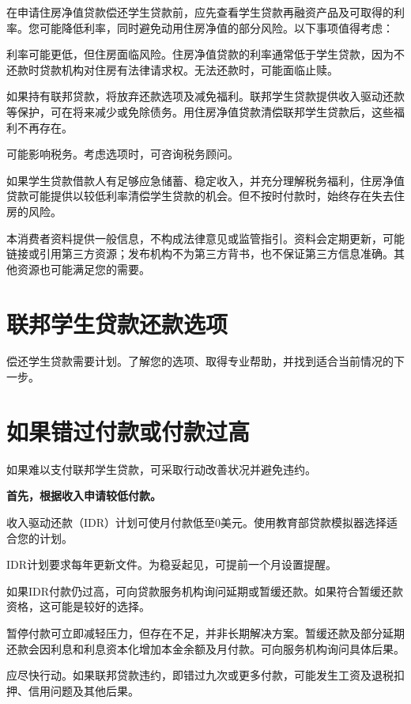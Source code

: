 \documentclass[UTF8,fontset=none,11pt,a4paper]{ctexart}
\begin{document}
在申请住房净值贷款偿还学生贷款前，应先查看学生贷款再融资产品及可取得的利率。您可能降低利率，同时避免动用住房净值的部分风险。以下事项\allowbreak\mbox{值得考虑：}


利率可能更低，但住房面临风险。住房净值贷款的利率通常低于学生贷款，因为不还款时贷款机构对住房有法律请求权。无法还款时，可能\allowbreak\mbox{面临止赎。}


如果持有联邦贷款，将放弃还款选项及减免福利。联邦学生贷款提供收入驱动还款等保护，可在将来减少或免除债务。用住房净值贷款清偿联邦学生贷款后，这些福利\allowbreak\mbox{不再存在。}


可能影响税务。考虑选项时，可咨询\allowbreak\mbox{税务顾问。}


如果学生贷款借款人有足够应急储蓄、稳定收入，并充分理解税务福利，住房净值贷款可能提供以较低利率清偿学生贷款的机会。但不按时付款时，始终存在失去住\allowbreak\mbox{房的风险。}


本消费者资料提供一般信息，不构成法律意见或监管指引。资料会定期更新，可能链接或引用第三方资源；发布机构不为第三方背书，也不保证第三方信息准确。其他资源也可能满足\allowbreak\mbox{您的需要。}


\section*{联邦学生贷款还款选项}
偿还学生贷款需要计划。了解您的选项、取得专业帮助，并找到适合当前情况\allowbreak\mbox{的下一步。}


\section*{如果错过付款或付款过高}
如果难以支付联邦学生贷款，可采取行动改善状况并\allowbreak\mbox{避免违约。}


\textbf{首先，根据收入申请较低付款。}


收入驱动还款（IDR）计划可使月付款低至0美元。使用教育部贷款模拟器选择适合\allowbreak\mbox{您的计划。}


IDR计划要求每年更新文件。为稳妥起见，可提前一个月\allowbreak\mbox{设置提醒。}


如果IDR付款仍过高，可向贷款服务机构询问延期或暂缓还款。如果符合暂缓还款资格，这可能是较\allowbreak\mbox{好的选择。}


暂停付款可立即减轻压力，但存在不足，并非长期解决方案。暂缓还款及部分延期还款会因利息和利息资本化增加本金余额及月付款。可向服务机构询问\allowbreak\mbox{具体后果。}


应尽快行动。如果联邦贷款违约，即错过九次或更多付款，可能发生工资及退税扣押、信用问题及\allowbreak\mbox{其他后果。}
\end{document}
